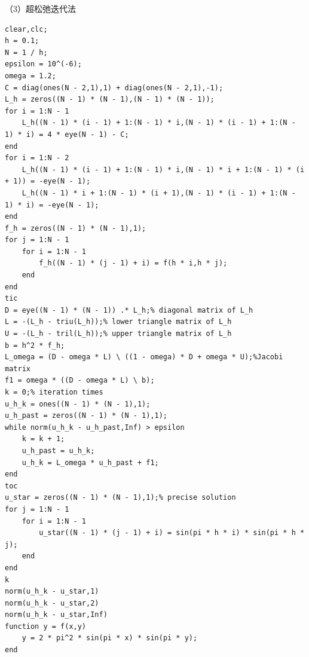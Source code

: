 \documentclass[10pt,a4paper]{article}
\begin{document}
（3）超松弛迭代法
\begin{lstlisting}
clear,clc;
h = 0.1;
N = 1 / h;
epsilon = 10^(-6);
omega = 1.2;
C = diag(ones(N - 2,1),1) + diag(ones(N - 2,1),-1);
L_h = zeros((N - 1) * (N - 1),(N - 1) * (N - 1));
for i = 1:N - 1
    L_h((N - 1) * (i - 1) + 1:(N - 1) * i,(N - 1) * (i - 1) + 1:(N - 1) * i) = 4 * eye(N - 1) - C;
end
for i = 1:N - 2
    L_h((N - 1) * (i - 1) + 1:(N - 1) * i,(N - 1) * i + 1:(N - 1) * (i + 1)) = -eye(N - 1);
    L_h((N - 1) * i + 1:(N - 1) * (i + 1),(N - 1) * (i - 1) + 1:(N - 1) * i) = -eye(N - 1);
end
f_h = zeros((N - 1) * (N - 1),1);
for j = 1:N - 1
    for i = 1:N - 1
        f_h((N - 1) * (j - 1) + i) = f(h * i,h * j);
    end
end
tic
D = eye((N - 1) * (N - 1)) .* L_h;% diagonal matrix of L_h
L = -(L_h - triu(L_h));% lower triangle matrix of L_h
U = -(L_h - tril(L_h));% upper triangle matrix of L_h
b = h^2 * f_h;
L_omega = (D - omega * L) \ ((1 - omega) * D + omega * U);%Jacobi matrix
f1 = omega * ((D - omega * L) \ b);
k = 0;% iteration times
u_h_k = ones((N - 1) * (N - 1),1);
u_h_past = zeros((N - 1) * (N - 1),1);
while norm(u_h_k - u_h_past,Inf) > epsilon
    k = k + 1;
    u_h_past = u_h_k;
    u_h_k = L_omega * u_h_past + f1;
end
toc
u_star = zeros((N - 1) * (N - 1),1);% precise solution
for j = 1:N - 1
    for i = 1:N - 1
        u_star((N - 1) * (j - 1) + i) = sin(pi * h * i) * sin(pi * h * j);
    end
end
k
norm(u_h_k - u_star,1)
norm(u_h_k - u_star,2)
norm(u_h_k - u_star,Inf)
function y = f(x,y)
    y = 2 * pi^2 * sin(pi * x) * sin(pi * y);
end
\end{lstlisting}
\end{document}

